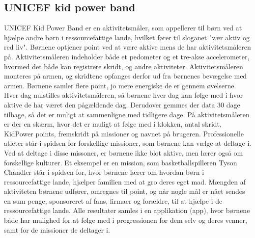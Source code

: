 \subsection{UNICEF kid power band}
UNICEF Kid Power Band er en aktivitetsmåler, som appellerer til børn ved at hjælpe andre børn i ressourcefattige lande, hvilket fører til sloganet "vær aktiv og red liv". Børnene optjener point ved at være  aktive mens de har aktivitetsmåleren på. Aktivitetsmåleren indeholder både et pedometer og et tre-akse accelerometer, hvormed det både kan registrere skridt, og andre aktiviteter. Aktivitetsmåleren monteres på armen, og skridtene opfanges derfor ud fra børnenes bevægelse med armen. Børnene samler flere point, jo mere energiske de er gennem øvelserne. Hver dag nulstilles aktivitetsmåleren, så børnene hver dag kan følge med i hvor aktive de har været den pågældende dag. Derudover gemmes der data 30 dage tilbage, så det er muligt at sammenligne med tidligere dage. På aktivitetsmåleren er der en skærm, hvor det er muligt at følge med i klokken, antal skridt, KidPower points, fremskridt på missioner og navnet på brugeren.\citep{PowerAbout2015,PowerManual2015} \newline 
Professionelle atleter står i spidsen for forskellige missioner, som børnene kan vælge at deltage i. Ved at deltage i disse missoner, er børnene ikke blot aktive, men lærer også om forskellige kulturer. Et eksempel er en mission, som basketballspilleren Tyson Chandler står i spidsen for, hvor børnene lærer om hvordan børn i ressourcefattige lande, hjælper familien med at gro deres eget mad.\citep{PowerMission2015} \newline
Mængden af aktiviteten børnene udfører, omregnes til point, og når nogle mål er nået sendes en sum penge, sponsoreret af fans, firmaer og forældre, til at hjælpe i de ressourcefattige lande. \newline
Alle resultater samles i en applikation (app), hvor børnene både har mulighed for at følge med i progressionen for dem selv og deres venner, samt for de missioner de deltager i.\citep{PowerAbout2015}


